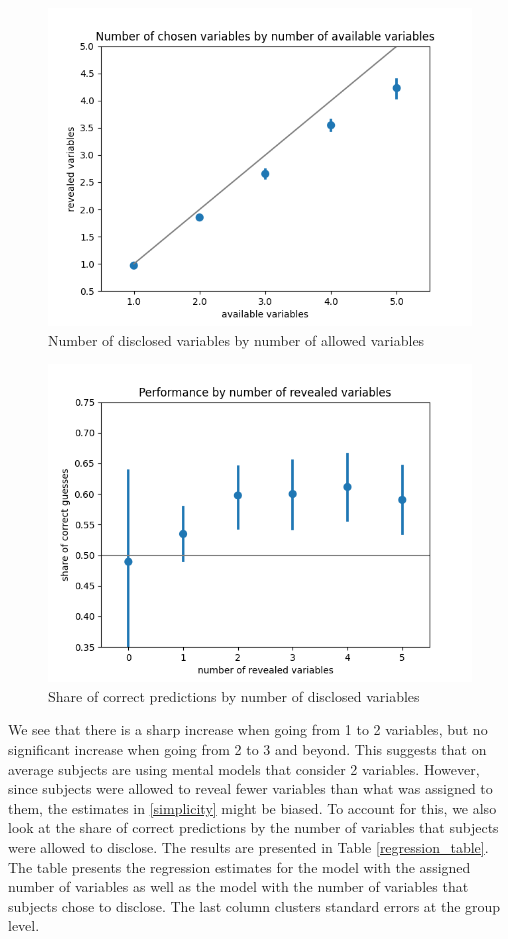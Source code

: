 \documentclass[
  12pt,
]{article}
\begin{document}
\begin{figure}

{\centering \includegraphics[width=0.65\linewidth]{../computed_objects/figures/revealed_available} 

}

\caption{\label{simplicity2} Number of disclosed variables by number of allowed variables}\label{fig:simplicity2}
\end{figure}

\begin{figure}

{\centering \includegraphics[width=0.65\linewidth]{../computed_objects/figures/revealed_variables_pooled} 

}

\caption{\label{simplicity} Share of correct predictions by number of disclosed variables}\label{fig:simplicity}
\end{figure}

We see that there is a sharp increase when going from 1 to 2 variables,
but no significant increase when going from 2 to 3 and beyond. This
suggests that on average subjects are using mental models that consider
2 variables. However, since subjects were allowed to reveal fewer
variables than what was assigned to them, the estimates in
\ref{simplicity} might be biased. To account for this, we also look at
the share of correct predictions by the number of variables that
subjects were allowed to disclose. The results are presented in Table
\ref{regression_table}. The table presents the regression estimates for
the model with the assigned number of variables as well as the model
with the number of variables that subjects chose to disclose. The last
column clusters standard errors at the group level.
\end{document}
